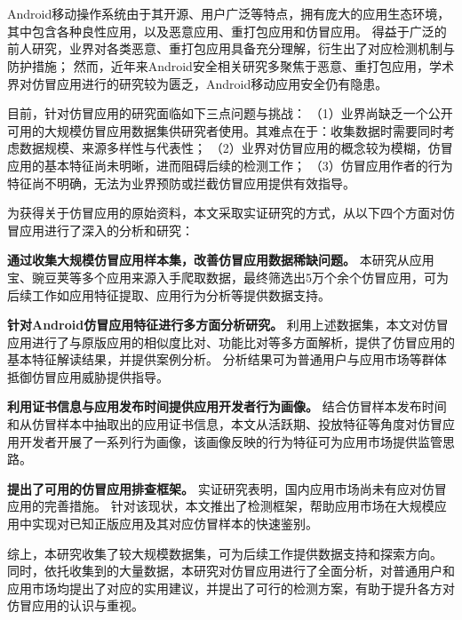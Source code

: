 \cleardoublepage{}

\chapter*{}
\vspace{-5mm}

\setlength{\baselineskip}{25pt} %

Android移动操作系统由于其开源、用户广泛等特点，拥有庞大的应用生态环境，其中包含各种良性应用，以及恶意应用、重打包应用和仿冒应用。
得益于广泛的前人研究，业界对各类恶意、重打包应用具备充分理解，衍生出了对应检测机制与防护措施；
然而，近年来Android安全相关研究多聚焦于恶意、重打包应用，学术界对仿冒应用进行的研究较为匮乏，Android移动应用安全仍有隐患。

目前，针对仿冒应用的研究面临如下三点问题与挑战：
（1）业界尚缺乏一个公开可用的大规模仿冒应用数据集供研究者使用。其难点在于：收集数据时需要同时考虑数据规模、来源多样性与代表性；
（2）业界对仿冒应用的概念较为模糊，仿冒应用的基本特征尚未明晰，进而阻碍后续的检测工作；
（3）仿冒应用作者的行为特征尚不明确，无法为业界预防或拦截仿冒应用提供有效指导。

为获得关于仿冒应用的原始资料，本文采取实证研究的方式，从以下四个方面对仿冒应用进行了深入的分析和研究：

\textbf{通过收集大规模仿冒应用样本集，改善仿冒应用数据稀缺问题。}
本研究从应用宝、豌豆荚等多个应用来源入手爬取数据，最终筛选出5万个余个仿冒应用，可为后续工作如应用特征提取、应用行为分析等提供数据支持。

\textbf{针对Android仿冒应用特征进行多方面分析研究。}
利用上述数据集，本文对仿冒应用进行了与原版应用的相似度比对、功能比对等多方面解析，提供了仿冒应用的基本特征解读结果，并提供案例分析。
分析结果可为普通用户与应用市场等群体抵御仿冒应用威胁提供指导。

\textbf{利用证书信息与应用发布时间提供应用开发者行为画像。}
结合仿冒样本发布时间和从仿冒样本中抽取出的应用证书信息，本文从活跃期、投放特征等角度对仿冒应用开发者开展了一系列行为画像，该画像反映的行为特征可为应用市场提供监管思路。

\textbf{提出了可用的仿冒应用排查框架。}
实证研究表明，国内应用市场尚未有应对仿冒应用的完善措施。
针对该现状，本文推出了检测框架\mytool ，帮助应用市场在大规模应用中实现对已知正版应用及其对应仿冒样本的快速鉴别。

综上，本研究收集了较大规模数据集，可为后续工作提供数据支持和探索方向。
同时，依托收集到的大量数据，本研究对仿冒应用进行了全面分析，对普通用户和应用市场均提出了对应的实用建议，并提出了可行的检测方案，有助于提升各方对仿冒应用的认识与重视。

 
